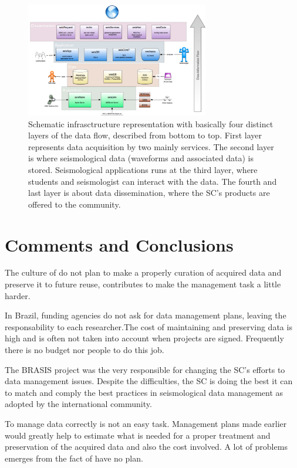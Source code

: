 \documentclass[twoside,letterpaper,twocolumn]{article}
\begin{document}
\begin{figure}[ht!]
\centering
\includegraphics[width=8cm]{images/datacenter.png}
\caption[Figure 4]{Schematic infrasctructure representation with basically four distinct layers of the data flow, described from bottom to top. First layer represents data acquisition by two mainly services. The second layer is where seismological data (waveforms and associated data) is stored. Seismological applications runs at the third layer, where students and seismologist can interact with the data. The fourth and last layer is about data dissemination, where the SC's products are offered to the community.}
\end{figure}

\section{Comments and Conclusions}

The culture of do not plan to make a properly curation of acquired data and preserve it to future reuse, contributes to make the management task a little harder. 

In Brazil, funding agencies do not ask for data management plans, leaving the responsability to each researcher.The cost of maintaining and preserving data is high and is often not taken into account when projects are signed. Frequently there is no budget nor people to do this job.

The BRASIS project was the very responsible for changing the SC's efforts to data management issues. Despite the difficulties, the SC is doing the best it can to match and comply the best practices in seismological data management as adopted by the international community.

To manage data correctly is not an easy task. Management plans made earlier would greatly help to estimate what is needed for a proper treatment and preservation of the acquired data and also the cost involved. A lot of problems emerges from the fact of have no plan.
\end{document}
